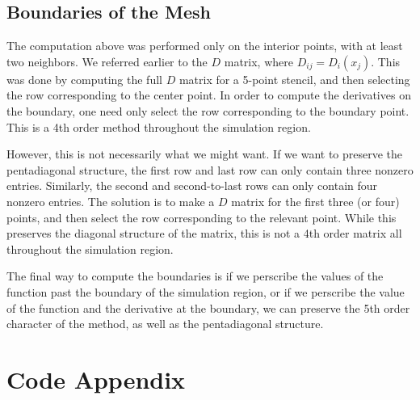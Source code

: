 \documentclass{article}
\begin{document}
\subsection{Boundaries of the Mesh}

The computation above was performed only on the interior points,
	with at least two neighbors.
We referred earlier to the $D$ matrix, where $D_{ij} = D_i(x_j)$.
This was done by computing the full $D$ matrix for a 5-point stencil,
	and then selecting the row corresponding to the center point.
In order to compute the derivatives on the boundary, one need only select
	the row corresponding to the boundary point.
This is a 4th order method throughout the simulation region.

However, this is not necessarily what we might want.
If we want to preserve the pentadiagonal structure, the first row
	and last row can only contain three nonzero entries.
Similarly, the second and second-to-last rows can only contain four
	nonzero entries.
The solution is to make a $D$ matrix for the first three (or four)
	points, and then select the row corresponding to the relevant point.
While this preserves the diagonal structure of the matrix, this is not
	a  4th order matrix all throughout the simulation region.

The final way to compute the boundaries is if we perscribe the values 
	of the function past the boundary of the simulation region,
	or if we perscribe the value of the function and the derivative
	at the boundary, we can preserve the 5th order character
	of the method, as well as the pentadiagonal structure.

\appendix
\section{Code Appendix}
\lstset{language=python}

\end{document}
